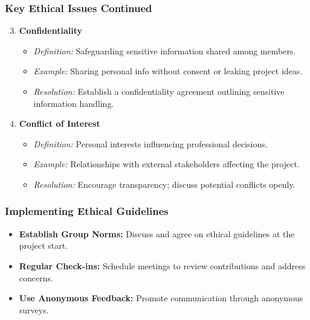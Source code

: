 \documentclass[aspectratio=169]{beamer}
\begin{document}
\begin{frame}[fragile]
    \frametitle{Key Ethical Issues Continued}
    \begin{enumerate}
        \setcounter{enumi}{2} %
        \item \textbf{Confidentiality}
        \begin{itemize}
            \item \textit{Definition:} Safeguarding sensitive information shared among members.
            \item \textit{Example:} Sharing personal info without consent or leaking project ideas.
            \item \textit{Resolution:} Establish a confidentiality agreement outlining sensitive information handling.
        \end{itemize}

        \item \textbf{Conflict of Interest}
        \begin{itemize}
            \item \textit{Definition:} Personal interests influencing professional decisions.
            \item \textit{Example:} Relationships with external stakeholders affecting the project.
            \item \textit{Resolution:} Encourage transparency; discuss potential conflicts openly.
        \end{itemize}
    \end{enumerate}
\end{frame}

\begin{frame}[fragile]
    \frametitle{Implementing Ethical Guidelines}
    \begin{itemize}
        \item \textbf{Establish Group Norms:} Discuss and agree on ethical guidelines at the project start.
        \item \textbf{Regular Check-ins:} Schedule meetings to review contributions and address concerns.
        \item \textbf{Use Anonymous Feedback:} Promote communication through anonymous surveys.
    \end{itemize}
\end{frame}
\end{document}
